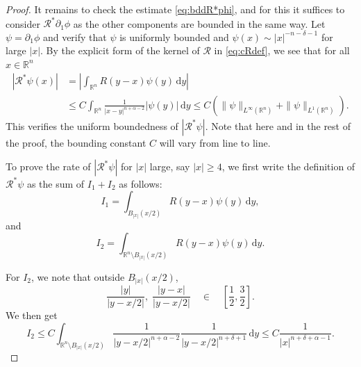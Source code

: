 \documentclass[10pt,a4paper]{amsart}
\newcommand{\R}{{\mathbb{R}}}
\newcommand{\dd}{\mathrm{d}}
\begin{document}
\begin{proof}
It remains to check the estimate \eqref{eq:bddR*phi}, and for this it suffices to consider $\mathcal{R}^*\partial_1 \phi$ as the other components are bounded in the same way. Let $\psi = \partial_1\phi$ and verify that $\psi$ is uniformly bounded and $\psi(x) \sim |x|^{-n-\delta-1}$ for large $|x|$. By the explicit form of the kernel of $\mathcal{R}$ in \eqref{eq:cRdef}, we see that for all $x\in \R^n$
\begin{equation*}
\begin{aligned}
    |\mathcal{R}^*\psi(x)| &= \left|\int_{\R^n} R(y-x)\psi(y)\,\dd y\right|\\ 
    &\le C\int_{\R^n} \frac{1}{|x-y|^{n+\alpha-2}}|\psi(y)|\,\dd y \le C(\|\psi\|_{L^\infty(\R^n)} + \|\psi\|_{L^1(\R^n)}).
    \end{aligned}
\end{equation*}
This verifies the uniform boundedness of $|\mathcal{R}^*\psi|$. Note that here and in the rest of the proof, the bounding constant $C$ will vary from line to line.

To prove the rate of $|\mathcal{R}^*\psi|$  for $|x|$ large, say $|x|\ge 4$, we first write the definition of $\mathcal{R}^*\psi$ as the sum of $I_1+I_2$ as follows:
\begin{equation*}
    I_1 = \int_{B_{|x|}(x/2)} R(y-x)\psi(y)\,\dd y,
\end{equation*}
and
\begin{equation*}
    I_2 = \int_{\R^n\setminus B_{|x|}(x/2)}  R(y-x)\psi(y)\,\dd y.
\end{equation*}

For $I_2$, we note that outside $B_{|x|}(x/2)$, 
\begin{equation*}
    \frac{|y|}{|y-x/2|}, \; \frac{|y-x|}{|y-x/2|} \quad \in \quad [\frac12, \frac32].
\end{equation*}
We then get
\begin{equation*}
    I_2 \le C\int_{\R^n\setminus B_{|x|}(x/2)} \frac{1}{|y-x/2|^{n+\alpha-2}} \frac{1}{|y-x/2|^{n+\delta+1}}\,\dd y \le C\frac{1}{|x|^{n+\delta+\alpha-1}}.
\end{equation*}


\end{proof}
\end{document}

